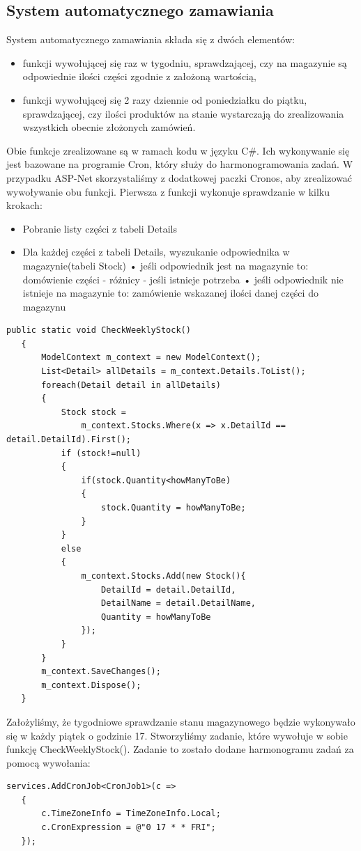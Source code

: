 \documentclass{article}
\begin{document}
\subsection{System automatycznego zamawiania}
System automatycznego zamawiania składa się z dwóch elementów:
\begin{itemize}
   \item funkcji wywołującej się raz w tygodniu, sprawdzającej, czy na magazynie są odpowiednie
   ilości części zgodnie z założoną wartością,
   \item funkcji wywołującej się 2 razy dziennie od poniedziałku do piątku, sprawdzającej, czy
   ilości produktów na stanie wystarczają do zrealizowania wszystkich obecnie złożonych zamówień.
\end{itemize}
Obie funkcje zrealizowane są w ramach kodu w języku C\#. Ich wykonywanie się jest bazowane na
programie Cron, który służy do harmonogramowania zadań. W przypadku ASP-Net skorzystaliśmy z
dodatkowej paczki Cronos, aby zrealizować wywoływanie obu funkcji.
Pierwsza z funkcji wykonuje sprawdzanie w kilku krokach:
\begin{itemize}
   \item Pobranie listy części z tabeli Details
   \item Dla każdej części z tabeli Details, wyszukanie odpowiednika w magazynie(tabeli Stock)
      \subitem • jeśli odpowiednik jest na magazynie to: domówienie części - różnicy - jeśli istnieje
       potrzeba 
      \subitem • jeśli odpowiednik nie istnieje na magazynie to: zamówienie wskazanej ilości danej części
      do magazynu 
\end{itemize}
\begin{lstlisting}[style=sharpc,caption={Funkcja tygodniowego sprawdzania magazynu}]
   public static void CheckWeeklyStock()
   {
       ModelContext m_context = new ModelContext();
       List<Detail> allDetails = m_context.Details.ToList();
       foreach(Detail detail in allDetails)
       {
           Stock stock = 
               m_context.Stocks.Where(x => x.DetailId == detail.DetailId).First();
           if (stock!=null)
           {
               if(stock.Quantity<howManyToBe)
               {
                   stock.Quantity = howManyToBe;
               }
           }
           else
           {
               m_context.Stocks.Add(new Stock(){ 
                   DetailId = detail.DetailId, 
                   DetailName = detail.DetailName, 
                   Quantity = howManyToBe 
               });
           }
       }
       m_context.SaveChanges();
       m_context.Dispose();
   }
\end{lstlisting}
Założyliśmy, że tygodniowe sprawdzanie stanu magazynowego będzie wykonywało się w każdy piątek o
godzinie 17. Stworzyliśmy zadanie, które wywołuje w sobie funkcję CheckWeeklyStock(). Zadanie to
zostało dodane harmonogramu zadań za pomocą wywołania: \newpage
\begin{lstlisting}[style=sharpc,caption={Dodanie zadania do harmonogramu}]
   services.AddCronJob<CronJob1>(c =>
   {
       c.TimeZoneInfo = TimeZoneInfo.Local;
       c.CronExpression = @"0 17 * * FRI";
   });
\end{lstlisting}
\end{document}
